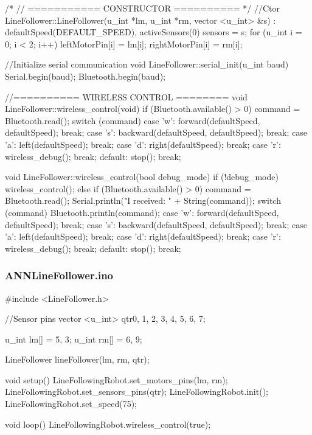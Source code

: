 \documentclass[14pt,a4paper]{extarticle}
\begin{document}
\begin{spverbatim}
/*
//  =========== CONSTRUCTOR ==========
*/
//Ctor
LineFollower::LineFollower(u_int *lm, u_int *rm, vector <u_int> &s)
: defaultSpeed(DEFAULT_SPEED),
  activeSensors(0) {
  sensors = s;
  for (u_int i = 0; i < 2; i++)
  {
    leftMotorPin[i] = lm[i];
    rightMotorPin[i] = rm[i];
  }
}

//Initialize serial communication
void LineFollower::serial_init(u_int baud)
{
  Serial.begin(baud);
  Bluetooth.begin(baud);
}

//========== WIRELESS CONTROL ========
void LineFollower::wireless_control(void)
{
  if (Bluetooth.available() > 0) 
  	command = Bluetooth.read();
  switch (command)
  {
    case 'w':
      forward(defaultSpeed, defaultSpeed);
      break;
    case 's':
      backward(defaultSpeed, defaultSpeed);
      break;
    case 'a':
      left(defaultSpeed);
      break;
    case 'd':
      right(defaultSpeed);
      break;
    case 'r':
      wireless_debug();
      break;
    default:
      stop();
      break;
  }
}

void LineFollower::wireless_control(bool debug_mode)
{
  if (!debug_mode) wireless_control();
  else
  {
    if (Bluetooth.available() > 0){
      command = Bluetooth.read();
      Serial.println("I received: " + String(command));
    }
    switch (command){
      Bluetooth.println(command);
      case 'w':
        forward(defaultSpeed, defaultSpeed);
        break;
      case 's':
        backward(defaultSpeed, defaultSpeed);
        break;
      case 'a':
        left(defaultSpeed);
        break;
      case 'd':
        right(defaultSpeed);
        break;
      case 'r':
        wireless_debug();
        break;
      default:
        stop();
        break;
    }
  }
}

	\end{spverbatim}
	
	\subsubsection{ANNLineFollower.ino}
	
	\begin{spverbatim}
#include <LineFollower.h>

//Sensor pins
vector <u_int> qtr{0, 1, 2, 3, 4, 5, 6, 7};

u_int lm[] = {5, 3};
u_int rm[] = {6, 9};

LineFollower lineFollower(lm, rm, qtr);

void setup()
{
  LineFollowingRobot.set_motors_pins(lm, rm);
  LineFollowingRobot.set_sensors_pins(qtr);
  LineFollowingRobot.init();
  LineFollowingRobot.set_speed(75);
}

void loop() {
 LineFollowingRobot.wireless_control(true);
}
	\end{spverbatim}
\end{document}
